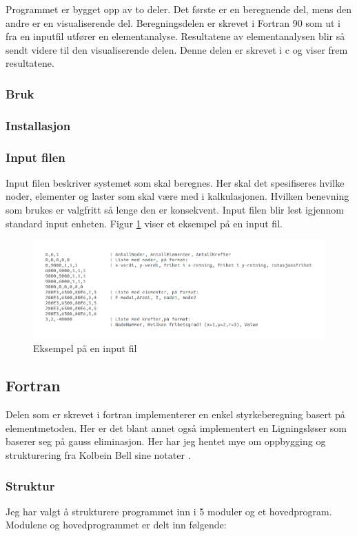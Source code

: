 \documentclass[10pt,a4paper, norsk]{article}
\begin{document}
Programmet er bygget opp av to deler. Det første er en beregnende del, mens den andre er en visualiserende del. Beregningsdelen er skrevet i  Fortran 90 som ut i fra en inputfil utfører en elementanalyse. Resultatene av elementanalysen blir så sendt videre til den visualiserende delen. Denne delen er skrevet i c og viser frem resultatene. 
\subsubsection{Bruk}
\subsubsection{Installasjon}
\subsubsection{Input filen}
Input filen beskriver systemet som skal beregnes. Her skal det spesifiseres hvilke noder, elementer og laster som skal være med i kalkulasjonen. Hvilken benevning som brukes er valgfritt så lenge den er konsekvent. Input filen blir lest igjennom standard input enheten. Figur \ref{fig:input} viser et eksempel på en input fil.

\begin{figure}[h]\label{fig:input}
\centering
\includegraphics[scale=0.5]{input.png} 
\caption{Eksempel på en input fil}
\end{figure}


\subsection{Fortran}
Delen som er skrevet i fortran implementerer en enkel styrkeberegning basert på elementmetoden. Her er det blant annet også implementert en Ligningsløser som baserer seg på gauss eliminasjon. Her har jeg hentet mye om oppbygging og strukturering fra Kolbein Bell sine notater \cite{KolbeinBellFortran} \cite{KolbeinBellProgram}.  


\subsubsection{Struktur}
Jeg har valgt å strukturere programmet inn i 5 moduler og et hovedprogram. Modulene og hovedprogrammet er delt inn følgende:
\end{document}
